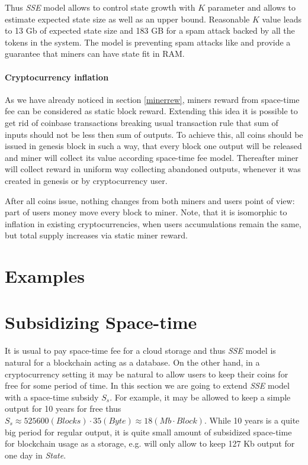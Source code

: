 \documentclass[]{article}   %
\newcommand{\authnote}[2]{\marginpar{\parbox{\marginparwidth}{\tiny %
  \textsf{#1 {\textcolor{blue}{notes: #2}}}}}%
  \textcolor{blue}{\textbf{\dag}}}
\newcommand{\authnote}[2]{
  \textsf{#1 \textcolor{blue}{: #2}}}
\newcommand{\authnote}[2]{}
\newcommand{\knote}[1]{{\authnote{\textcolor{green}{Alex notes}}{#1}}}
\newcommand{\esse}{\textit{SSE}}
\newcommand{\state}{\textit{State}}
\begin{document}
Thus \esse{} model allows to control state growth with $K$ parameter and allows to estimate expected state size as well as an upper bound. Reasonable $K$ value leads to 13 Gb of expected state size and 183 GB for a spam attack backed by all the tokens in the system. The model is preventing spam attacks like \cite{bitcoin2015flood} and provide a guarantee that miners can have state fit in RAM.


\paragraph{Cryptocurrency inflation}

As we have already noticed in section \ref{minerrew}, miners reward from space-time fee can be considered as static block reward. Extending this idea it is possible to get rid of coinbase transactions breaking usual transaction rule that sum of inputs should not be less then sum of outputs. To achieve this, all coins should be issued in genesis block in such a way, that every block one output will be released and miner will collect its value according space-time fee model. Thereafter miner will collect reward in uniform way collecting abandoned outputs, whenever it was created in genesis or by cryptocurrency user.

After all coins issue, nothing changes from both miners and users point of view: part of users money move every block to miner. Note, that it is isomorphic to inflation in existing cryptocurrencies, when users accumulations remain the same, but total supply increases via static miner reward.

\section{Examples}

\knote{moneychain and datachain}

\section{Subsidizing Space-time}

It is usual to pay space-time fee for a cloud storage and thus \esse{} model is natural for a blockchain acting as a database. On the other hand, in a cryptocurrency setting it may be natural to allow users to keep their coins for free for some period of time. In this section we are going to extend \esse{} model with a space-time subsidy $S_s$. For example, it may be allowed to keep a simple output for 10 years for free thus $S_s \approx 525600 (Blocks) \cdot 35 (Byte) \approx 18 (Mb \cdot Block)$. While 10 years is a quite big period for regular output, it is quite small amount of subsidized space-time for blockchain usage as a storage, e.g. will only allow to keep 127 Kb output for one day in \state{}.
\end{document}
